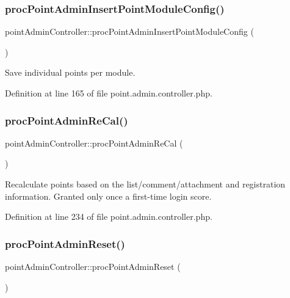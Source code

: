 \subsubsection{\texorpdfstring{proc\+Point\+Admin\+Insert\+Point\+Module\+Config()}{procPointAdminInsertPointModuleConfig()}}
{\footnotesize\ttfamily point\+Admin\+Controller\+::proc\+Point\+Admin\+Insert\+Point\+Module\+Config (\begin{DoxyParamCaption}{ }\end{DoxyParamCaption})}



Save individual points per module. 



Definition at line 165 of file point.\+admin.\+controller.\+php.

\mbox{\label{classpointAdminController_a0932223bc8b3441dcfff013c6050ee89}} 
\subsubsection{\texorpdfstring{proc\+Point\+Admin\+Re\+Cal()}{procPointAdminReCal()}}
{\footnotesize\ttfamily point\+Admin\+Controller\+::proc\+Point\+Admin\+Re\+Cal (\begin{DoxyParamCaption}{ }\end{DoxyParamCaption})}



Recalculate points based on the list/comment/attachment and registration information. Granted only once a first-\/time login score. 



Definition at line 234 of file point.\+admin.\+controller.\+php.

\mbox{\label{classpointAdminController_ab5131a2b0dd2fe07086034dceb9ae26f}} 
\subsubsection{\texorpdfstring{proc\+Point\+Admin\+Reset()}{procPointAdminReset()}}
{\footnotesize\ttfamily point\+Admin\+Controller\+::proc\+Point\+Admin\+Reset (\begin{DoxyParamCaption}{ }\end{DoxyParamCaption})}



